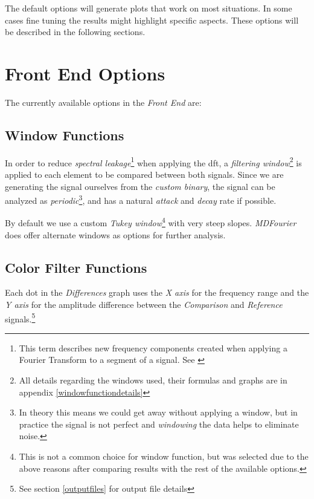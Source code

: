 \documentclass[10pt,a4paper]{report}
\begin{document}
\begin{appendices}
The default options will generate plots that work on most situations. In some cases fine tuning the results might highlight specific aspects. These options will be described in the following sections.

\section{Front End Options}

The currently available options in the \textit{Front End} are:

\subsection{Window Functions}
\label{windows}

In order to reduce \textit{spectral leakage}\footnote{This term describes new frequency components created when applying a Fourier Transform to a segment of a signal. See \cite{leakage}} when applying the \acrshort{dft}, a \textit{filtering window}\footnote{All details regarding the windows used, their formulas and graphs are in appendix \ref{windowfunctiondetails}} is applied to each element to be compared between both signals. Since we are generating the signal ourselves from the \textit{custom binary}, the signal can be analyzed as \textit{periodic}\footnote{In theory this means we could get away without applying a window, but in practice the signal is not perfect and \textit{windowing} the data helps to eliminate noise.}, and has a natural \textit{attack} and \textit{decay} rate if possible.

By default we use a custom \textit{Tukey window}\footnote{This is not a common choice for window function, but was selected due to the above reasons after comparing results with  the rest of the available options.} with very steep slopes. \textit{MDFourier} does offer alternate windows as options for further analysis.

\subsection{Color Filter Functions}
\label{colorfilter}

Each dot in the \textit{Differences} graph uses the \textit{X axis} for the frequency range and the \textit{Y axis} for the amplitude difference between the \textit{Comparison} and \textit{Reference} signals.\footnote{See section \ref{outputfiles} for output file details}


\end{appendices}
\end{document}
